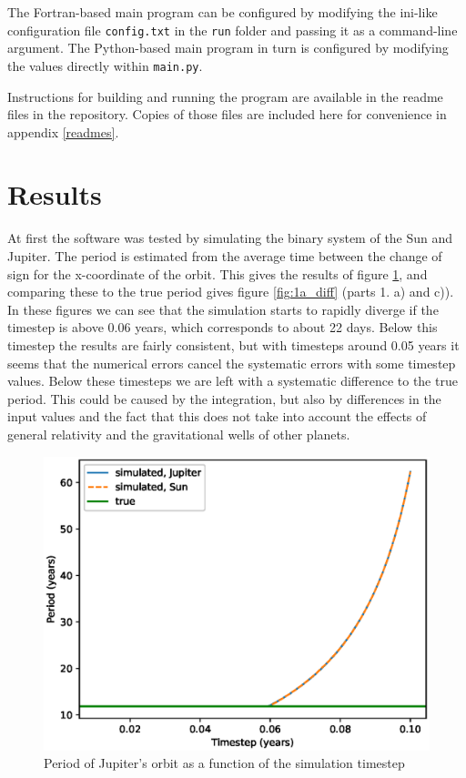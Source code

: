 \documentclass[a4paper]{article}
\begin{document}
The Fortran-based main program can be configured by modifying the ini-like configuration file \texttt{config.txt} in the \texttt{run} folder and passing it as a command-line argument.
The Python-based main program in turn is configured by modifying the values directly within \texttt{main.py}.

Instructions for building and running the program are available in the readme files in the repository.
Copies of those files are included here for convenience in appendix \ref{readmes}.




\clearpage
\section{Results}
At first the software was tested by simulating the binary system of the Sun and Jupiter.
The period is estimated from the average time between the change of sign for the x-coordinate of the orbit.
This gives the results of figure \ref{fig:1a}, and comparing these to the true period gives figure \ref{fig:1a_diff} (parts 1. a) and c)).
In these figures we can see that the simulation starts to rapidly diverge if the timestep is above 0.06 years, which corresponds to about 22 days.
Below this timestep the results are fairly consistent, but with timesteps around 0.05 years it seems that the numerical errors cancel the systematic errors with some timestep values.
Below these timesteps we are left with a systematic difference to the true period.
This could be caused by the integration, but also by differences in the input values and the fact that this does not take into account the effects of general relativity and the gravitational wells of other planets.

\clearpage
\begin{figure}[ht!]
\centering
\includegraphics[width=\textwidth]{fig_1a_1.eps}
\caption{Period of Jupiter's orbit as a function of the simulation timestep}
\label{fig:1a}
\end{figure}
\end{document}
